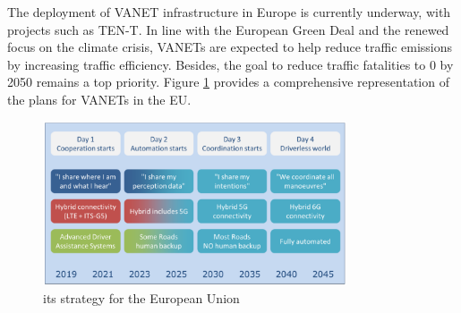 The deployment of VANET infrastructure in Europe is currently underway, with projects such as TEN-T.  In line with the European Green Deal and the renewed focus on the climate crisis, VANETs are expected to help reduce traffic emissions by increasing traffic efficiency. Besides, the goal to reduce traffic fatalities to 0 by 2050 remains a top priority\cite{lu_pan-european_2019}. Figure \ref{fig:EU_strat} provides a comprehensive representation of the plans for VANETs in the EU.

\begin{figure}[htbp]
    \centering
    \includegraphics[width=0.8\textwidth]{Chapters/Figures/VANETs/ITS_strategy_EU.png}
   	\caption{\gls{its} strategy for the European Union~\cite{lu_pan-european_2019}}
   	\label{fig:EU_strat}
\end{figure}




